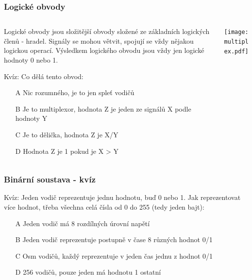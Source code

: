 \documentclass{beamer}
\begin{document}
\begin{frame}
\frametitle{Logické obvody}

\begin{columns}
\begin{column}{0.55\textwidth}
Logické obvody jsou složitější obvody složené ze základních logických členů - hradel. Signály se mohou větvit, spojují se vždy nějakou logickou operací.
Výsledkem logického obvodu jsou vždy jen logické hodnoty 0 nebo 1.

\bigskip

Kvíz: Co dělá tento obvod:
\begin{itemize}
\item[A] Nic rozumného, je to jen spleť vodičů
\item[B] Je to multiplexor, hodnota Z je jeden ze signálů X podle hodnoty Y
\item[C] Je to dělička, hodnota Z je X/Y
\item[D] Hodnota Z je 1 pokud je X > Y 
\end{itemize}
\end{column}
\begin{column}{0.45\textwidth}  
\begin{center}
   \texttt{[image: multiplex.pdf]}
\end{center}
\end{column}
\end{columns}


\end{frame}


\begin{frame}
\frametitle{Binární soustava - kvíz}

Kvíz: Jeden vodič reprezentuje jednu hodnotu, buď 0 nebo 1. Jak reprezentovat více hodnot, třeba všechna celá čísla od 0 do 255 (tedy jeden bajt):
\begin{itemize}
\item[A] Jeden vodič má 8 rozdílných úrovní napětí
\item[B] Jeden vodič reprezentuje postupně v čase 8 různých hodnot 0/1
\item[C] Osm vodičů, každý reprezentuje v jeden čas jednu z hodnot 0/1
\item[D] 256 vodičů, pouze jeden má hodnotu 1 ostatní 
\end{itemize}


\end{frame}
\end{document}
